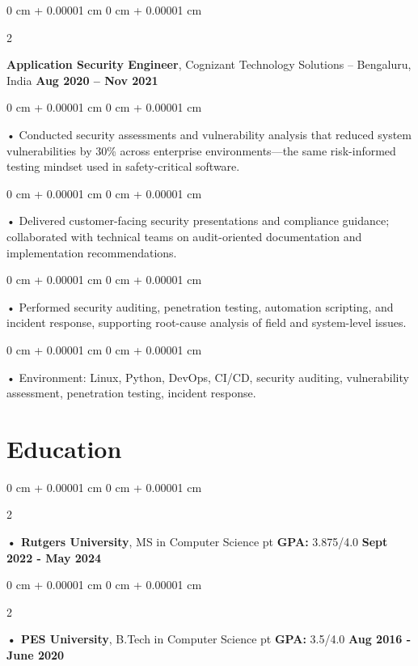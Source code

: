 \documentclass[10pt, letterpaper]{article}
\newenvironment{onecolentry}{
    \begin{adjustwidth}{
        0 cm + 0.00001 cm
    }{
        0 cm + 0.00001 cm
    }
}{
    \end{adjustwidth}
} %
\newenvironment{twocolentry}[2][]{
    \onecolentry
    \def\secondColumn{#2}
    \setcolumnwidth{\fill, 4.5 cm}
    \begin{paracol}{2}
}{
    \switchcolumn \raggedleft \secondColumn
    \end{paracol}
    \endonecolentry
} %
\begin{document}
        \begin{twocolentry}{
            \textbf{Aug 2020 – Nov 2021}
        }
            \vspace{2 pt }
            \textbf{Application Security Engineer}, Cognizant Technology Solutions -- Bengaluru, India\end{twocolentry}
        \begin{onecolentry}
             • Conducted security assessments and vulnerability analysis that reduced system vulnerabilities by 30\% across enterprise environments---the same risk-informed testing mindset used in safety-critical software.
        \end{onecolentry}
        \begin{onecolentry}
             • Delivered customer-facing security presentations and compliance guidance; collaborated with technical teams on audit-oriented documentation and implementation recommendations.
        \end{onecolentry}
        \begin{onecolentry}
             • Performed security auditing, penetration testing, automation scripting, and incident response, supporting root-cause analysis of field and system-level issues.
        \end{onecolentry}
        \begin{onecolentry}
             • Environment: Linux, Python, DevOps, CI/CD, security auditing, vulnerability assessment, penetration testing, incident response.
        \end{onecolentry}
    \vspace{2 pt }
        \section{Education}
        \vspace{2 pt }
        \begin{twocolentry}{
            \textbf{Sept 2022 - May 2024}
        }
            \textbf{ • Rutgers University}, MS in Computer Science  pt \textbf{GPA:} 3.875/4.0  \end{twocolentry}

        \begin{twocolentry}{
            \textbf{Aug 2016 - June 2020}
        }
            \textbf{ • PES University}, B.Tech in Computer Science  pt \textbf{GPA:} 3.5/4.0  \end{twocolentry}
\end{document}
